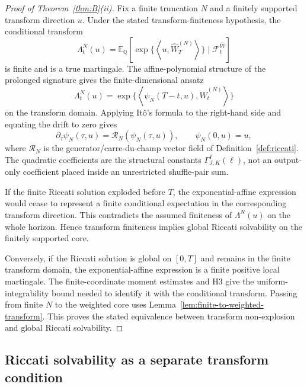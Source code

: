 \documentclass[11pt,oneside]{article}
\theoremstyle{plain}
\theoremstyle{definition}
\theoremstyle{remark}
\newcommand{\E}{\mathbb{E}}
\newcommand{\Q}{\mathbb{Q}}
\newcommand{\cW}{\widehat W}
\newcommand{\FWh}{\mathcal F^{\widehat W}}
\newcommand{\Rs}{\mathcal R}
\newcommand{\inner}[2]{\left\langle #1,#2\right\rangle}
\begin{document}
\begin{proof}[Proof of Theorem~\ref{thm:B}(ii)]
Fix a finite truncation $N$ and a finitely supported transform direction $u$. Under the stated transform-finiteness hypothesis, the conditional transform
\[
\Lambda_t^N(u)=\E_\Q\left[\exp\{\inner{u}{\cW_T^{(N)}}\}\mid\FWh_t\right]
\]
is finite and is a true martingale. The affine-polynomial structure of the prolonged signature gives the finite-dimensional ansatz
\[
\Lambda_t^N(u)=\exp\{\inner{\psi_N(T-t,u)}{\cW_t^{(N)}}\}
\]
on the transform domain. Applying It\^o's formula to the right-hand side and equating the drift to zero gives
\[
\partial_\tau\psi_N(\tau,u)=\Rs_N(\psi_N(\tau,u)),\qquad \psi_N(0,u)=u,
\]
where $\Rs_N$ is the generator/carre-du-champ vector field of Definition~\ref{def:riccati}. The quadratic coefficients are the structural constants $\Gamma^I_{J,K}(\ell)$, not an output-only coefficient placed inside an unrestricted shuffle-pair sum.

If the finite Riccati solution exploded before $T$, the exponential-affine expression would cease to represent a finite conditional expectation in the corresponding transform direction. This contradicts the assumed finiteness of $\Lambda^N(u)$ on the whole horizon. Hence transform finiteness implies global Riccati solvability on the finitely supported core.

Conversely, if the Riccati solution is global on $[0,T]$ and remains in the finite transform domain, the exponential-affine expression is a finite positive local martingale. The finite-coordinate moment estimates and H3 give the uniform-integrability bound needed to identify it with the conditional transform. Passing from finite $N$ to the weighted core uses Lemma~\ref{lem:finite-to-weighted-transform}. This proves the stated equivalence between transform non-explosion and global Riccati solvability.
\end{proof}

\subsection{Riccati solvability as a separate transform condition}
\end{document}

